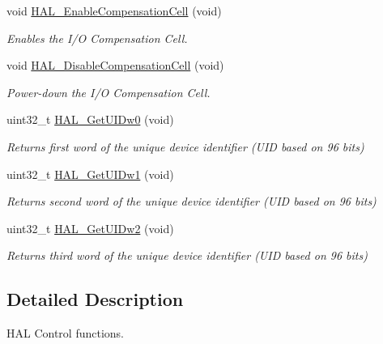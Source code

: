 \begin{DoxyCompactItemize}
void \hyperlink{group___h_a_l___exported___functions___group2_ga20b6ca07582e10aec5e15ad2fda7dfc1}{H\+A\+L\+\_\+\+Enable\+Compensation\+Cell} (void)
\begin{DoxyCompactList}\small\item\em Enables the I/O Compensation Cell. \end{DoxyCompactList}\item 
void \hyperlink{group___h_a_l___exported___functions___group2_ga653f1166b0e37afd40372550d806e667}{H\+A\+L\+\_\+\+Disable\+Compensation\+Cell} (void)
\begin{DoxyCompactList}\small\item\em Power-\/down the I/O Compensation Cell. \end{DoxyCompactList}\item 
uint32\+\_\+t \hyperlink{group___h_a_l___exported___functions___group2_gaf982aa0a575eef3758c0840a24077506}{H\+A\+L\+\_\+\+Get\+U\+I\+Dw0} (void)
\begin{DoxyCompactList}\small\item\em Returns first word of the unique device identifier (U\+ID based on 96 bits) \end{DoxyCompactList}\item 
uint32\+\_\+t \hyperlink{group___h_a_l___exported___functions___group2_ga52720dd92ed2bd4314a2a129855d766c}{H\+A\+L\+\_\+\+Get\+U\+I\+Dw1} (void)
\begin{DoxyCompactList}\small\item\em Returns second word of the unique device identifier (U\+ID based on 96 bits) \end{DoxyCompactList}\item 
uint32\+\_\+t \hyperlink{group___h_a_l___exported___functions___group2_ga5785ae5ec8d4c5a7dadb1359f0778700}{H\+A\+L\+\_\+\+Get\+U\+I\+Dw2} (void)
\begin{DoxyCompactList}\small\item\em Returns third word of the unique device identifier (U\+ID based on 96 bits) \end{DoxyCompactList}\end{DoxyCompactItemize}


\subsection{Detailed Description}
H\+AL Control functions. 

